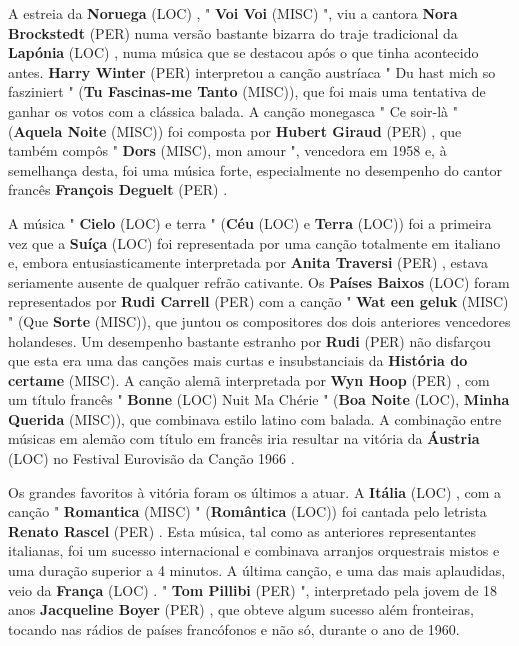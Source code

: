 \documentclass[12pt,a4paper]{article}
\begin{document}
A estreia da \textbf{Noruega} (LOC) , " \textbf{Voi Voi} (MISC) ", viu a cantora \textbf{Nora Brockstedt} (PER) numa versão bastante bizarra do traje tradicional da \textbf{Lapónia} (LOC) , numa música que se destacou após o que tinha acontecido antes. \textbf{Harry Winter} (PER) interpretou a canção austríaca " Du hast mich so fasziniert " (\textbf{Tu Fascinas-me Tanto} (MISC)), que foi mais uma tentativa de ganhar os votos com a clássica balada. A canção monegasca " Ce soir-là " (\textbf{Aquela Noite} (MISC)) foi composta por \textbf{Hubert Giraud} (PER) , que também compôs " \textbf{Dors} (MISC), mon amour ", vencedora em 1958 e, à semelhança desta, foi uma música forte, especialmente no desempenho do cantor francês \textbf{François Deguelt} (PER) .

A música " \textbf{Cielo} (LOC) e terra " (\textbf{Céu} (LOC) e \textbf{Terra} (LOC)) foi a primeira vez que a \textbf{Suíça} (LOC) foi representada por uma canção totalmente em italiano e, embora entusiasticamente interpretada por \textbf{Anita Traversi} (PER) , estava seriamente ausente de qualquer refrão cativante. Os \textbf{Países Baixos} (LOC) foram representados por \textbf{Rudi Carrell} (PER) com a canção " \textbf{Wat een geluk} (MISC) " (Que \textbf{Sorte} (MISC)), que juntou os compositores dos dois anteriores vencedores holandeses. Um desempenho bastante estranho por \textbf{Rudi} (PER) não disfarçou que esta era uma das canções mais curtas e insubstanciais da \textbf{História do certame} (MISC). A canção alemã interpretada por \textbf{Wyn Hoop} (PER) , com um título francês " \textbf{Bonne} (LOC) Nuit Ma Chérie " (\textbf{Boa Noite} (LOC), \textbf{Minha Querida} (MISC)), que combinava estilo latino com balada. A combinação entre músicas em alemão com título em francês iria resultar na vitória da \textbf{Áustria} (LOC) no Festival Eurovisão da Canção 1966 .

Os grandes favoritos à vitória foram os últimos a atuar. A \textbf{Itália} (LOC) , com a canção " \textbf{Romantica} (MISC) " (\textbf{Romântica} (LOC)) foi cantada pelo letrista \textbf{Renato Rascel} (PER) . Esta música, tal como as anteriores representantes italianas, foi um sucesso internacional e combinava arranjos orquestrais mistos e uma duração superior a 4 minutos. A última canção, e uma das mais aplaudidas, veio da \textbf{França} (LOC) . " \textbf{Tom Pillibi} (PER) ", interpretado pela jovem de 18 anos \textbf{Jacqueline Boyer} (PER) , que obteve algum sucesso além fronteiras, tocando nas rádios de países francófonos e não só, durante o ano de 1960.
\end{document}
